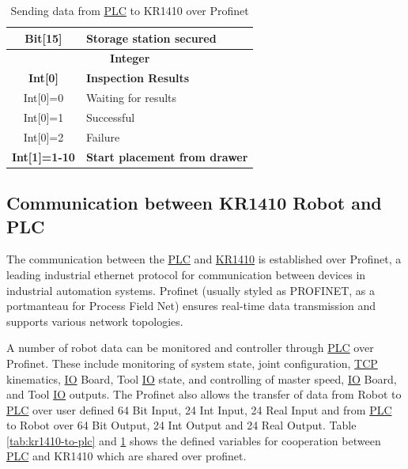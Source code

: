 \begin{table}[h!]
\begin{tabular}{c@{\hskip 2cm}l}
      Bit[15] & Storage station secured\\
      \hline
      \multicolumn{2}{c}{\textbf{Integer}} \\ \hline
      \textbf{Int[0]} & \textbf{Inspection Results}\\
      Int[0]=0 & Waiting for results\\
      Int[0]=1 & Successful\\
      Int[0]=2 & Failure\\
      \textbf{Int[1]=1-10} & \textbf{Start placement from drawer}\\
      \hline
  \end{tabular}
  \caption{Sending data from \hyperref[acro:PLC]{PLC} to KR1410 over Profinet}
  \label{tab:plc-to-kr1410}
\end{table}

\subsection{Communication between KR1410 Robot and PLC}
The communication between the \hyperref[acro:PLC]{PLC} and \hyperref[acro:KR]{KR1410} is established over Profinet, a leading industrial ethernet protocol for communication between devices in industrial automation systems. Profinet (usually styled as PROFINET, as a portmanteau for Process Field Net) ensures real-time data transmission and supports various network topologies. \cite{profinet}

A number of robot data can be monitored and controller through \hyperref[acro:PLC]{PLC} over Profinet. These include monitoring of system state, joint configuration,
\hyperref[acro:TCP]{TCP} kinematics, \hyperref[acro:IO]{IO} Board, Tool \hyperref[acro:IO]{IO} state, and controlling of master speed, \hyperref[acro:IO]{IO} Board, and Tool \hyperref[acro:IO]{IO} outputs. The Profinet also allows the transfer of
data from Robot to \hyperref[acro:PLC]{PLC} over user defined 64 Bit Input, 24 Int Input, 24 Real Input and from \hyperref[acro:PLC]{PLC} to Robot over 64 Bit Output, 24 Int Output and 24 Real Output. \cite{kr-profinet} Table \ref{tab:kr1410-to-plc} and \ref{tab:plc-to-kr1410} shows the defined variables for cooperation between \hyperref[acro:PLC]{PLC} and KR1410 which are shared over profinet.


